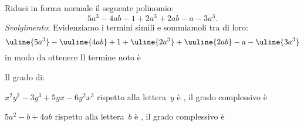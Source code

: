 
\subsubsection*{}

\subsubsection*{}

\begin{esercizio}
\label{ese:10.1}
Riduci in forma normale il seguente polinomio:
\[5a^3-4ab-1+2a^3+2ab-a-3a^3.\]
\emph{Svolgimento}: Evidenziamo i termini simili e sommiamoli tra di loro:
\[\uline{5a^3}-\uuline{4ab}+1+\uline{2a^3}+\uuline{2ab}-a-\uline{3a^3}\]
in modo da ottenere \dotfill Il termine noto è \dotfill
\end{esercizio}

\begin{esercizio}
\label{ese:10.2}
Il grado di:
\begin{enumeratea}
\item \(x^2y^2-3y^3+5yx-6y^2x^3\) rispetto alla lettera~\(y\) è \dotfill, 
il grado complessivo è \dotfill
\item \(5a^2-b+4ab\) rispetto alla lettera~\(b\) è \dotfill, il grado 
complessivo è \dotfill
\end{enumeratea}
\end{esercizio}

